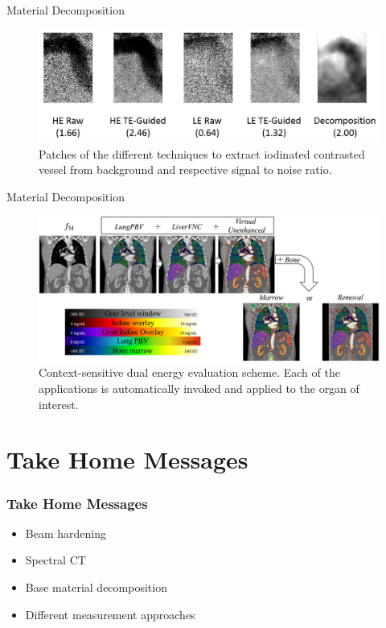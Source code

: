 \begin{frame}[t]{Material Decomposition}
	\begin{figure}[htpb]
		\centering
		\includegraphics[height=0.6\textheight]{images/mueller_material_decomposition2.png}
		\caption{Patches of the different techniques to extract iodinated contrasted vessel from background and respective signal to noise ratio.}%
	\end{figure}
	\flushright{}
	\tiny
\end{frame}


\begin{frame}[t]{Material Decomposition}
	\begin{figure}[htpb]
		\centering
		\includegraphics[height=0.7\textheight]{images/dorn_dual_energy.png}
		\caption{Context-sensitive dual energy evaluation scheme. Each of the applications is automatically invoked and applied to the organ of interest.}%
	\end{figure}
	\flushright{}
	\tiny
\end{frame}


\section{Take Home Messages}

\begin{frame}
    \frametitle{Take Home Messages}
    \begin{itemize}
        \item Beam hardening
        \item Spectral CT
        \item Base material decomposition
        \item Different measurement approaches
    \end{itemize}
\end{frame}



